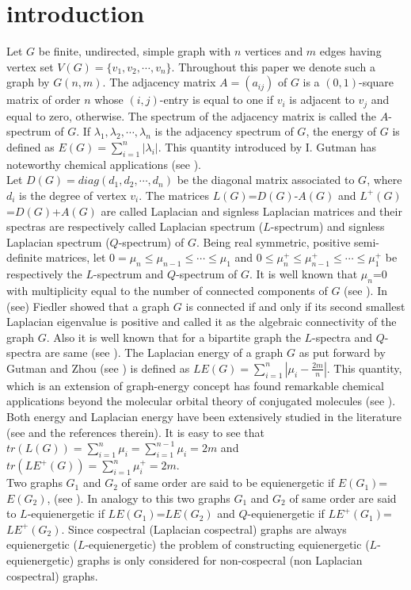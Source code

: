 \documentclass[12pt,a4paper]{amsart}
\theoremstyle{theorem}
\theoremstyle{definition}
\numberwithin{equation}{section} \makeatletter
\begin{document}
\section{introduction}\label{sec1}
Let $G$ be finite, undirected, simple graph with $n$ vertices and $m$ edges having vertex set $V(G)=\{v_1, v_2, \cdots, v_n\}$. Throughout this paper we denote such a graph by $G(n,m)$. The adjacency matrix $A=(a_{ij})$ of $G$ is a $(0, 1)$-square matrix of order $n$ whose $(i,j)$-entry is equal to one if $v_i$ is adjacent to $v_j$ and equal to zero, otherwise. The spectrum of the adjacency matrix is called the $A$-spectrum of $G$. If $\lambda_1, \lambda_2, \cdots, \lambda_n$ is the adjacency spectrum of $G$, the energy of $G$ is defined as $E(G)=\sum_{i=1}^{n}|\lambda_i|$.  This quantity introduced by I. Gutman has noteworthy chemical applications (see \cite{gp}).\\
\indent Let $D(G)={diag}(d_1, d_2, \cdots, d_n)$ be the diagonal matrix associated to $G$, where $d_i$ is the degree of vertex $v_i$. The matrices $L(G)$=$D(G)$-$A(G)$ and $L^+(G)$=$D(G)$+$A(G)$ are called Laplacian and signless Laplacian matrices and their spectras are respectively called Laplacian spectrum ($L$-spectrum) and signless Laplacian spectrum ($Q$-spectrum) of $G$. Being real symmetric, positive semi-definite matrices, let $0=\mu_n\leq\mu_{n-1}\leq\cdots\leq\mu_1$ and $0\leq\mu^+_n\leq\mu^+_{n-1}\leq\cdots\leq\mu^+_1$ be respectively the $L$-spectrum and $Q$-spectrum of $G$. It is well known that $\mu_n$=0 with multiplicity equal to the number of connected components of $G$ (see \cite{f}). In (see\cite{f}) Fiedler showed that a graph $G$ is connected if and only if its second smallest Laplacian eigenvalue is positive and called it as the algebraic connectivity of the graph $G$. Also it is well known that for a bipartite graph the $L$-spectra and $Q$-spectra are same (see \cite{cs}). The Laplacian energy of a graph $G$ as put forward by Gutman and Zhou (see \cite{gz}) is defined as $LE(G)=\sum\limits_{i=1}^{n}|\mu_i-\frac{2m}{n}|$. This quantity, which is an extension of graph-energy concept has found remarkable chemical applications beyond the molecular orbital theory of conjugated molecules (see \cite{rg}). Both energy and Laplacian energy have been extensively studied in the literature (see \cite{a,lsg,wh,z,zg} and the references therein). It is easy to see that
\indent $tr(L(G))=\sum_{i=1}^{n}\mu_i=\sum_{i=1}^{n-1}\mu_i=2m$ and $tr(LE^+(G))=\sum_{i=1}^{n}\mu^+_i=2m$.\\
\indent Two graphs $G_1$ and $G_2$ of same order are said to be equienergetic if $E(G_1)$=$E(G_2)$, (see \cite{b,rgra}). In analogy to this two graphs $G_1$ and $G_2$ of same order are said to $L$-equienergetic if $LE(G_1)$=$LE(G_2)$ and $Q$-equienergetic if $LE^+(G_1)$=$LE^+(G_2)$. Since cospectral (Laplacian cospectral) graphs are always equienergetic ($L$-equienergetic) the problem of constructing equienergetic ($L$-equienergetic) graphs is only considered for non-cospecral (non Laplacian cospectral) graphs.\\
\end{document}
